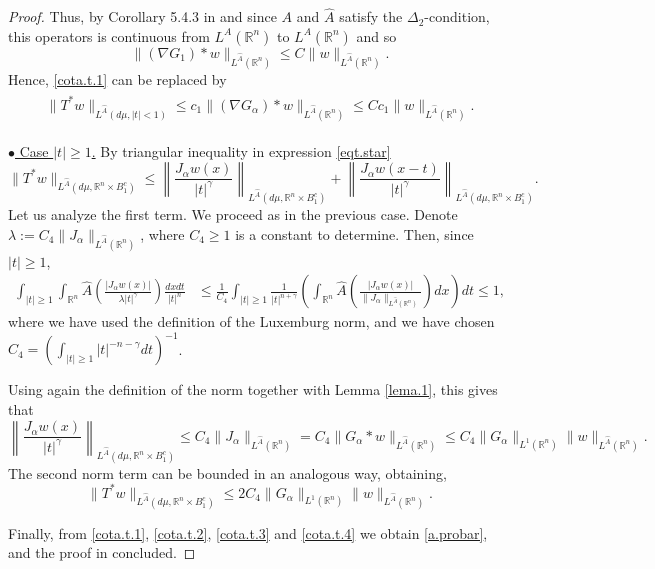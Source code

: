\documentclass[leqno,twoside, 12pt]{amsart}
\theoremstyle{plain}
\numberwithin{equation}{section} \numberwithin{figure}{section}
\theoremstyle{definition}
\newcommand{\R}{\mathbb R}
\numberwithin{equation}{section}
\begin{document}
\begin{proof}
 Thus, by Corollary 5.4.3 in \cite{HH} and since $A$ and $\hat A$ satisfy the $\Delta_2$-condition, this operators is continuous from $L^A(\mathbb{R}^n)$ to $L^A(\mathbb{R}^n)$ and so  
 $$
 \|(\nabla G_1)*w \|_{L^{\hat A}(\R^n)} \leq C\|w\|_{L^{\hat A}(\R^n)}.
 $$
 Hence, \eqref{cota.t.1} can be replaced by
 \begin{align} \label{cota.t.3}
 \begin{split}
 \|T^*w\|_{L^{\hat{A}}(d\mu, |t| < 1)} \leq 
 c_1 \|(\nabla G_\alpha)* w\|_{L^{\hat A}(\R^n)}
 \leq C c_1 \|w\|_{L^{\hat A}(\R^n)}.
 \end{split}
 \end{align}
   
 
 \medskip
  

\noindent \underline{$\bullet$ Case $|t|\geq 1$.} By triangular inequality in expression \eqref{eqt.star}
$$
\|T^*w\|_{L^{\hat{A}}(d\mu,  \mathbb{R}^n \times B_1^c  )} \leq \left\| \frac{J_\alpha w(x)}{|t|^\gamma} \right\|_{L^{\hat{A}}(d\mu,  \mathbb{R}^n \times B_1^c  )} + \left\| \frac{J_\alpha w(x-t)}{|t|^\gamma} \right\|_{L^{\hat{A}}(d\mu,  \mathbb{R}^n \times B_1^c  )}.
$$
Let us analyze the first term. We proceed as in the previous case. Denote $\lambda:= C_4 \|J_\alpha\|_{L^{\hat A}(\R^n)}$, where $C_4\geq 1$ is a  constant to determine. Then, since $|t|\geq 1$,
\begin{align*}
\int_{|t| \geq 1}\int_{\R^n} \hat{A} \left( \frac{|J_\alpha w(x)|}{ \lambda |t|^\gamma} \right) \frac{dx dt}{|t|^n} &\leq  \frac{1}{C_4}
 \int_{|t| \geq 1} \frac{1}{ |t|^{n+\gamma }} \left( \int_{\mathbb{R}^n} \hat{A} \left( \frac{|J_\alpha w(x)|}{\|J_\alpha\|_{L^{\hat A}(\R^n)}} \right) dx \right) dt\leq 1,
\end{align*}
where we have used the definition of the Luxemburg norm,  and we have chosen $C_4 =\left(\int_{|t| \geq 1} |t|^{-n-\gamma}  dt\right)^{-1}$.

\noindent  Using again the definition of the norm together with Lemma \ref{lema.1}, this gives that
$$
\left\| \frac{J_\alpha w(x)}{|t|^\gamma} \right\|_{L^{\hat{A}}(d\mu,  \mathbb{R}^n \times B_1^c  )}  \leq C_4 \|J_\alpha\|_{L^{\hat A}(\R^n)} = C_4 \|G_\alpha* w\|_{L^{\hat A}(\R^n)} \leq C_4 \|G_\alpha\|_{L^1(\R^n)} \|w\|_{L^{\hat A}(\R^n)}.
$$
The second norm term can be bounded in an analogous way, obtaining, 
\begin{equation} \label{cota.t.4}
\|T^*w\|_{L^{\hat{A}}(d\mu,  \mathbb{R}^n \times B_1^c  )} \leq
2C_4 \|G_\alpha\|_{L^1(\R^n)} \|w\|_{L^{\hat A}(\R^n)}.
\end{equation}

\medskip
Finally, from \eqref{cota.t.1}, \eqref{cota.t.2}, \eqref{cota.t.3} and \eqref{cota.t.4} we obtain \eqref{a.probar}, and the proof in concluded.
\end{proof}
\end{document}
